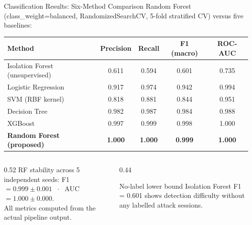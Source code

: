 \documentclass[aspectratio=169]{beamer}
\begin{document}
\begin{frame}{Classification Results: Six-Method Comparison}
  Random Forest (class\_weight=balanced, RandomizedSearchCV, 5-fold stratified CV)
  versus five baselines:

  \vspace{0.3em}
  \begin{table}
    \centering
    \small
    \begin{tabular}{lcccc}
      \toprule
      Method & Precision & Recall & F1 (macro) & ROC-AUC \\
      \midrule
      Isolation Forest (unsupervised)   & 0.611 & 0.594 & 0.601 & 0.735 \\
      Logistic Regression               & 0.917 & 0.974 & 0.942 & 0.994 \\
      SVM (RBF kernel)                  & 0.818 & 0.881 & 0.844 & 0.951 \\
      Decision Tree                     & 0.982 & 0.987 & 0.984 & 0.988 \\
      XGBoost                           & 0.997 & 0.999 & 0.998 & 1.000 \\
      \textbf{Random Forest (proposed)} & \textbf{1.000} & \textbf{1.000} & \textbf{0.999} & \textbf{1.000} \\
      \bottomrule
    \end{tabular}
  \end{table}

  \vspace{0.3em}
  \begin{columns}[T]
    \begin{column}{0.52\textwidth}
      \small RF stability across 5 independent seeds:
      F1 $= 0.999 \pm 0.001$ $\;\cdot\;$ AUC $= 1.000 \pm 0.000$.\\
      All metrics computed from the actual pipeline output.
    \end{column}
    \begin{column}{0.44\textwidth}
      \begin{block}{\small No-label lower bound}
        \small Isolation Forest F1 = 0.601 shows detection difficulty
        without any labelled attack sessions.
      \end{block}
    \end{column}
  \end{columns}
\end{frame}
\end{document}
